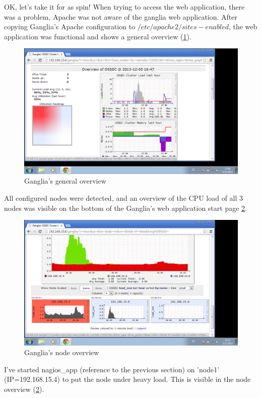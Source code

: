 \documentclass[12pt]{report}
\begin{document}
OK, let's take it for as spin! When trying to access the web
application, there was a problem, Apache was not aware of the ganglia
web application. After copying Ganglia's Apache configuration to
$/etc/apache2/sites-enabled$, the web application was functional and
shows a general overview (\cref{fig:ganglia_general}).
\begin{figure}[h!]
  \caption{Ganglia's general overview}
  \label{fig:ganglia_general}
  \centering
    \includegraphics[scale=0.3]{pics/ganglia_general.png}
\end{figure}
All configured nodes were detected, and an overview of the CPU load of
all 3 nodes was visible on the bottom of the Ganglia's web application
start page  \cref{fig:ganglia_node_overview}.
\begin{figure}[h!]
  \caption{Ganglia's node overview}
  \label{fig:ganglia_node_overview}
  \centering
    \includegraphics[scale=0.3]{pics/ganglia_node_overview.png}
\end{figure}
I've started nagios\_app (reference to the previous section) on 'node1'
(IP=192.168.15.4) to put the node under heavy load. This is
visible in the node overview (\cref{fig:ganglia_node_overview}).\\
\end{document}
